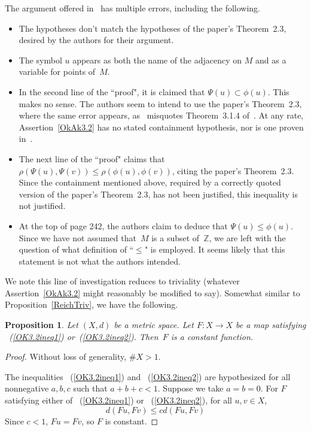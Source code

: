 \documentclass{article}
\newtheorem{prop}[thm]{Proposition}
\numberwithin{thm}{section}
\def\Z{{\mathbb Z}}
\begin{document}
The argument offered in~\cite{OkAk} has multiple errors,
including the following.
\begin{itemize}
    \item The hypotheses don't
    match the hypotheses of 
    the paper's Theorem~2.3,
    desired by the authors for
    their argument.
    \item The symbol $u$ appears as both the
          name of the adjacency on $M$
          and as a variable for points of~$M$.
    \item In the second line of the ``proof", it is claimed that
    $\Psi(u) \subset \phi(u)$. This makes no sense.
    The authors seem to intend to use 
    the paper's Theorem~2.3, where the same
    error appears, as~\cite{OkAk} misquotes
    Theorem~3.1.4 of~\cite{RaniEtAl}.
    At any rate, Assertion~\ref{OkAk3.2} has 
    no stated containment hypothesis, nor is
    one proven in~\cite{OkAk}.
    \item The next line of the ``proof" claims that
    $\rho(\Psi(u), \Psi(v)) \le \rho(\phi(u), \phi(v))$,
    citing the paper's Theorem~2.3. Since the containment mentioned 
    above, required by a correctly
    quoted version of the paper's
    Theorem~2.3, has not been justified,
    this inequality is not justified.
    \item At the top of page 242, the authors claim to deduce that
    $\Psi(u) \le \phi(u)$. Since we have not assumed that~$M$ is a
    subset of~$\Z$, we are left with the question of what definition
    of ``$\le$" is employed. It seems likely that this statement is
    not what the authors intended.
\end{itemize}

We note this line of investigation reduces
to triviality (whatever
Assertion~\ref{OkAk3.2} might reasonably be
modified to say). Somewhat
similar to Proposition~\ref{ReichTriv},
we have the following.

\begin{prop}
    \label{nonReichTriv}
    Let $(X,d)$ be a 
    metric space. Let
    $F: X \to X$ be a map 
    satisfying ~(\ref{OK3.2ineq1})
    or~(\ref{OK3.2ineq2}). 
   Then~$F$ is a constant function.
\end{prop}

\begin{proof}
    Without loss of generality, $\#X > 1$. 
    
    The inequalities 
    ~(\ref{OK3.2ineq1}) and
    ~(\ref{OK3.2ineq2})
    are hypothesized
    for all nonnegative $a,b,c$ such that
    $a+b+c < 1$. Suppose we take $a=b=0$.
   For $F$ satisfying either of ~(\ref{OK3.2ineq1}) or
    ~(\ref{OK3.2ineq2}),
  for all $u,v \in X$, 
   \[ d(Fu,Fv) \le c d(Fu,Fv)
   \]
Since $c < 1$, $Fu=Fv$, so $F$ is constant.
\end{proof}
\end{document}
